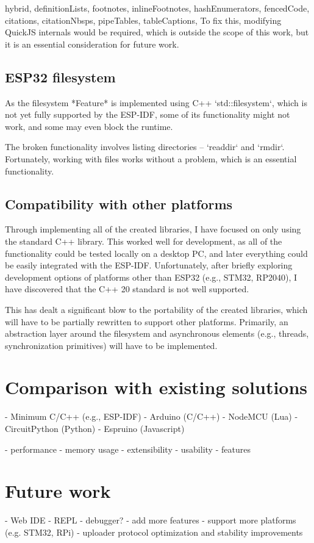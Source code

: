 \documentclass[
  digital,
  oneside,
  nosansbold,
  nocolorbold,
  lof,
  lot
]{fithesis4}
\begin{document}
\begin{markdown*}{%
  hybrid,
  definitionLists,
  footnotes,
  inlineFootnotes,
  hashEnumerators,
  fencedCode,
  citations,
  citationNbsps,
  pipeTables,
  tableCaptions,
}
To fix this, modifying QuickJS internals would be required, which is outside the scope of this work, but it is an essential consideration for future work.


\section{ESP32 filesystem}

As the filesystem *Feature* is implemented using C++ `std::filesystem`, which is not yet fully supported by the ESP-IDF, some of its functionality might not work, and some may even block the runtime.

The broken functionality involves listing directories -- `readdir` and `rmdir`. Fortunately, working with files works without a problem, which is an essential functionality.


\section{Compatibility with other platforms}

Through implementing all of the created libraries, I have focused on only using the standard C++ library. This worked well for development, as all of the functionality could be tested locally on a desktop PC, and later everything could be easily integrated with the ESP-IDF. Unfortunately, after briefly exploring development options of platforms other than ESP32 (e.g., STM32, RP2040), I have discovered that the C++ 20 standard is not well supported.

This has dealt a significant blow to the portability of the created libraries, which will have to be partially rewritten to support other platforms. Primarily, an abstraction layer around the filesystem and asynchronous elements (e.g., threads, synchronization primitives) will have to be implemented.


\chapter{Comparison with existing solutions}

  - Minimum C/C++ (e.g., ESP-IDF)
  - Arduino (C/C++)
  - NodeMCU (Lua)
  - CircuitPython (Python)
  - Espruino (Javascript)

  - performance
  - memory usage
  - extensibility
  - usability
  - features


\chapter{Future work}

  - Web IDE
  - REPL
  - debugger?
  - add more features
  - support more platforms (e.g. STM32, RPi)
  - uploader protocol optimization and stability improvements

\end{markdown*}
\end{document}

